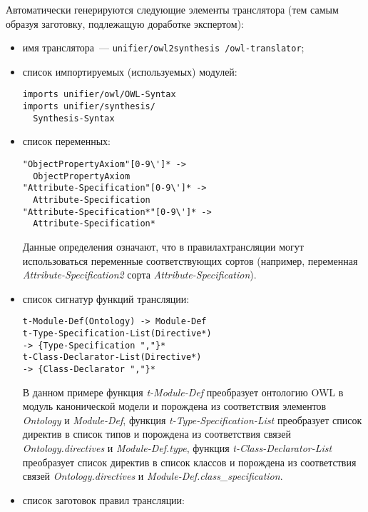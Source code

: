 \begin{multicols}{2}
Автоматически генерируются следующие элементы транслятора
(тем самым образуя заготовку, подлежащую доработке экспертом):
\begin{itemize}
\item имя транслятора~--- {\tt unifier/owl2synthesis /owl-translator};
\item список импортируемых (используемых) модулей:
{\small
\begin{verbatim}
imports unifier/owl/OWL-Syntax
imports unifier/synthesis/
  Synthesis-Syntax
\end{verbatim}
}
\item список переменных:
{\small
\begin{verbatim}
"ObjectPropertyAxiom"[0-9\']* ->
  ObjectPropertyAxiom
"Attribute-Specification"[0-9\']* ->
  Attribute-Specification
"Attribute-Specification*"[0-9\']* ->
  Attribute-Specification*
\end{verbatim}
}
Данные определения означают, что в правилах\linebreak трансляции могут
использоваться переменные соответствующих сортов (например, 
переменная {\it Attribute-Specification2} сорта {\it Attribute-Specification}).
\item список сигнатур функций трансляции:

{\small
\begin{verbatim}
t-Module-Def(Ontology) -> Module-Def
t-Type-Specification-List(Directive*)
-> {Type-Specification ","}*      
t-Class-Declarator-List(Directive*)
-> {Class-Declarator ","}*  
\end{verbatim}
}

В данном примере функция {\it t-Module-Def}
преоб\-ра\-зу\-ет онтологию OWL в модуль канонической модели и
порождена из соответствия %
элемен\-тов {\it Ontology} и {\it Module-Def},
функция %
{\it \mbox{t-Type}-Specification-List} преобразует список %
директив в список типов и порождена из соответствия
связей {\it Ontology.directives} и {\it Module-Def.type},
функция {\it t-Class-Declarator-List} преобразует список
директив в список классов и порождена из соответствия
связей {\it \mbox{Ontology}.directives} и {\it Module-Def.class\_specification}.

\item список заготовок правил трансляции:


\end{itemize}
\end{multicols}
